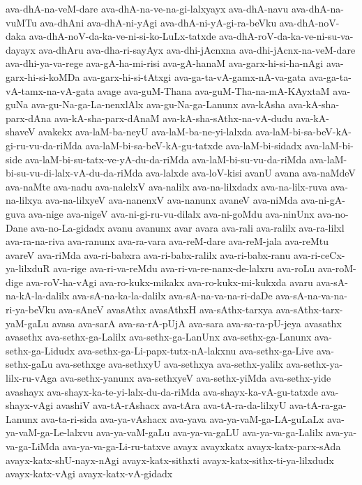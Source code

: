 {ava-dhA-na-veM-dare
ava-dhA-na-ve-na-gi-lalxyayx
ava-dhA-navu
ava-dhA-na-vuMTu
ava-dhAni
ava-dhA-ni-yAgi
ava-dhA-ni-yA-gi-ra-beVku
ava-dhA-noV-daka
ava-dhA-noV-da-ka-ve-ni-si-ko-LuLx-tatxde
ava-dhA-roV-da-ka-ve-ni-su-va-dayayx
ava-dhAru
ava-dha-ri-sayAyx
ava-dhi-jAcnxna
ava-dhi-jAcnx-na-veM-dare
ava-dhi-ya-va-rege
ava-gA-ha-mi-risi
ava-gA-hanaM
ava-garx-hi-si-ha-nAgi
ava-garx-hi-si-koMDa
ava-garx-hi-si-tAtxgi
ava-ga-ta-vA-gamx-nA-va-gata
ava-ga-ta-vA-tamx-na-vA-gata
avage
ava-guM-Thana
ava-guM-Tha-na-mA-KAyxtaM
ava-guNa
ava-gu-Na-ga-La-nenxlAlx
ava-gu-Na-ga-Lanunx
ava-kAsha
ava-kA-sha-parx-dAna
ava-kA-sha-parx-dAnaM
ava-kA-sha-sAthx-na-vA-dudu
ava-kA-shaveV
avakekx
ava-laM-ba-neyU
ava-laM-ba-ne-yi-lalxda
ava-laM-bi-sa-beV-kA-gi-ru-vu-da-riMda
ava-laM-bi-sa-beV-kA-gu-tatxde
ava-laM-bi-sidadx
ava-laM-bi-side
ava-laM-bi-su-tatx-ve-yA-du-da-riMda
ava-laM-bi-su-vu-da-riMda
ava-laM-bi-su-vu-di-lalx-vA-du-da-riMda
ava-lalxde
ava-loV-kisi
avanU
avana
ava-naMdeV
ava-naMte
ava-nadu
ava-nalelxV
ava-nalilx
ava-na-lilxdadx
ava-na-lilx-ruva
ava-na-lilxya
ava-na-lilxyeV
ava-nanenxV
ava-nanunx
avaneV
ava-niMda
ava-ni-gA-guva
ava-nige
ava-nigeV
ava-ni-gi-ru-vu-dilalx
ava-ni-goMdu
ava-ninUnx
ava-no-Dane
ava-no-La-gidadx
avanu
avanunx
avar
avara
ava-rali
ava-ralilx
ava-ra-lilxl
ava-ra-na-riva
ava-ranunx
ava-ra-vara
ava-reM-dare
ava-reM-jala
ava-reMtu
avareV
ava-riMda
ava-ri-babxra
ava-ri-babx-ralilx
ava-ri-babx-ranu
ava-ri-ceCx-ya-lilxduR
ava-rige
ava-ri-va-reMdu
ava-ri-va-re-nanx-de-lalxru
ava-roLu
ava-roM-dige
ava-roV-ha-vAgi
ava-ro-kukx-mikakx
ava-ro-kukx-mi-kukxda
avaru
ava-sA-na-kA-la-dalilx
ava-sA-na-ka-la-dalilx
ava-sA-na-va-na-ri-daDe
ava-sA-na-va-na-ri-ya-beVku
ava-sAneV
avasAthx
avasAthxH
ava-sAthx-tarxya
ava-sAthx-tarx-yaM-gaLu
avasa
ava-sarA
ava-sa-rA-pUjA
ava-sara
ava-sa-ra-pU-jeya
avasathx
avasethx
ava-sethx-ga-Lalilx
ava-sethx-ga-LanUnx
ava-sethx-ga-Lanunx
ava-sethx-ga-Lidudx
ava-sethx-ga-Li-papx-tutx-nA-lakxnu
ava-sethx-ga-Live
ava-sethx-gaLu
ava-sethxge
ava-sethxyU
ava-sethxya
ava-sethx-yalilx
ava-sethx-ya-lilx-ru-vAga
ava-sethx-yanunx
ava-sethxyeV
ava-sethx-yiMda
ava-sethx-yide
avashayx
ava-shayx-ka-te-yi-lalx-du-da-riMda
ava-shayx-ka-vA-gu-tatxde
ava-shayx-vAgi
avashiV
ava-tA-rAshacx
ava-tAra
ava-tA-ra-da-lilxyU
ava-tA-ra-ga-Lanunx
ava-ta-ri-sida
ava-ya-vAshacx
ava-yava
ava-ya-vaM-ga-LA-guLaLx
ava-ya-vaM-ga-Le-lalxvu
ava-ya-vaM-gaLu
ava-ya-va-gaLU
ava-ya-va-ga-Lalilx
ava-ya-va-ga-LiMda
ava-ya-va-ga-Li-ru-tatxve
avayx
avayxkatx
avayx-katx-parx-sAda
avayx-katx-shU-nayx-nAgi
avayx-katx-sithxti
avayx-katx-sithx-ti-ya-lilxdudx
avayx-katx-vAgi
avayx-katx-vA-gidadx
}
